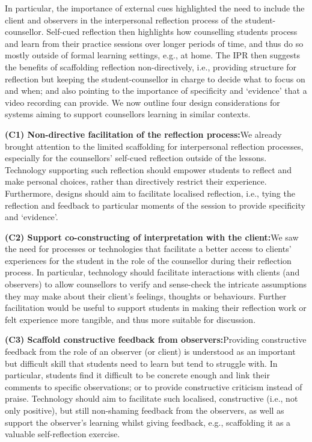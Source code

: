 \documentclass{sigchi}
\begin{document}
In particular, the importance of external cues highlighted the need to include the client and observers in the interpersonal reflection process of the student-counsellor. Self-cued reflection then highlights how counselling students process and learn from their practice sessions over longer periods of time, and thus do so mostly outside of formal learning settings, e.g., at home. The IPR then suggests the benefits of scaffolding reflection non-directively, i.e., providing structure for reflection but keeping the student-counsellor in charge to decide what to focus on and when; and also pointing to the importance of specificity and `evidence' that a video recording can provide. We now outline four design considerations for systems aiming to support counsellors learning in similar contexts. 

{\bf (C1) Non-directive facilitation of the reflection process:}\quad We already brought attention to the limited scaffolding for interpersonal reflection processes, especially for the counsellors' self-cued reflection outside of the lessons. Technology supporting such reflection should empower students to reflect and make personal choices, rather than directively restrict their experience. Furthermore, designs should aim to facilitate localised reflection, i.e., tying the reflection and feedback to particular moments of the session to provide specificity and `evidence'. 

{\bf (C2) Support co-constructing of interpretation with the client:}\quad We saw the need for processes or technologies that facilitate a better access to clients' experiences for the student in the role of the counsellor during their reflection process. In particular, technology should facilitate interactions with clients (and observers) to allow counsellors to verify and sense-check the intricate assumptions they may make about their client's feelings, thoughts or behaviours. Further facilitation would be useful to support students in making their reflection work or felt experience more tangible, and thus more suitable for discussion. 

{\bf (C3) Scaffold constructive feedback from observers:}\quad Providing constructive feedback from the role of an observer (or client) is understood as an important but difficult skill that students need to learn but tend to struggle with. In particular, students find it difficult to be concrete enough and link their comments to specific observations; or to provide constructive criticism instead of praise. Technology should aim to facilitate such localised, constructive (i.e., not only positive), but still non-shaming feedback from the observers, as well as support the observer's learning whilst giving feedback, e.g., scaffolding it as a valuable self-reflection exercise. 
\end{document}
